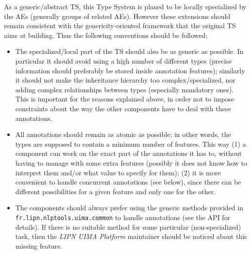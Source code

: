 \documentclass{article}
\newcommand{\softName}{{\em LIPN UIMA Platform}\xspace}
\newenvironment{xitemize}{
\begin{itemize}
  \setlength{\itemsep}{.3\baselineskip}
  \setlength{\topsep}{0pt}
  \setlength{\parskip}{0pt}
  \setlength{\parsep}{0pt}
}{\end{itemize}}
\newcommand{\packname}{fr.lipn.nlptools}
\newcommand{\uimaPackname}{\packname.uima}
\begin{document}
As a generic/abstract TS, this Type System is planed to be locally specialized by the AEs (generally groups of related AEs). However these extensions should remain consistent with the genericity-oriented framework that the original TS aims at building. Thus the following conventions should be followed:
\begin{xitemize}
\item The specialized/local part of the TS should also be as generic as possible. In particular it should avoid using a high number of different types (precise information should preferably be stored inside annotation features); similarly it should not make the inheritance hierarchy too complex/specialized, nor adding complex relationships between types (especially mandatory ones). This is important for the reasons explained above, in order not to impose constraints about the way the other components have to deal with these annotations.
\item  All annotations should remain as atomic as possible; in other words, the types are supposed to contain a minimum number of features. This way (1) a component can work on the exact part of the annotations it has to, without having to manage with some extra features (possibly it does not know how to interpret them and/or what value to specify for them); (2) it is more convenient to handle concurrent annotations (see below), since there can be different possibilities for a given feature  and only one for the other.
\item The components should always prefer using the generic methods provided in {\tt \uimaPackname.common} to handle annotations (see the API for details). If there is no suitable method for some particular (non-specialized) task, then the \softName maintainer should be noticed about this missing feature.
\end{xitemize}
\end{document}
